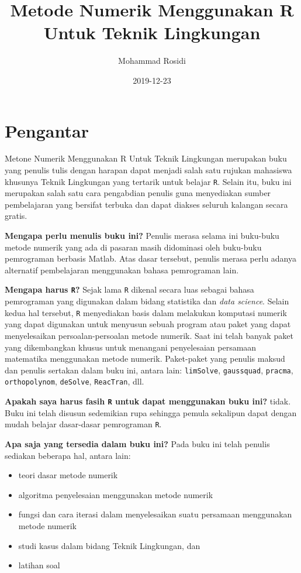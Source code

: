 \documentclass[]{book}
\title{Metode Numerik Menggunakan R Untuk Teknik Lingkungan}
\author{Mohammad Rosidi}
\date{2019-12-23}
\providecommand{\tightlist}{%
  \setlength{\itemsep}{0pt}\setlength{\parskip}{0pt}}
\theoremstyle{definition}
\theoremstyle{definition}
\theoremstyle{definition}
\theoremstyle{remark}
\begin{document}
\maketitle

{
\setcounter{tocdepth}{1}
\tableofcontents
}
\hypertarget{pengantar}{%
\chapter*{Pengantar}\label{pengantar}}

Metone Numerik Menggunakan R Untuk Teknik Lingkungan merupakan buku yang penulis tulis dengan harapan dapat menjadi salah satu rujukan mahasiswa khusunya Teknik Lingkungan yang tertarik untuk belajar \texttt{R}. Selain itu, buku ini merupakan salah satu cara pengabdian penulis guna menyediakan sumber pembelajaran yang bersifat terbuka dan dapat diakses seluruh kalangan secara gratis.

\textbf{Mengapa perlu menulis buku ini?} Penulis merasa selama ini buku-buku metode numerik yang ada di pasaran masih didominasi oleh buku-buku pemrograman berbasis Matlab. Atas dasar tersebut, penulis merasa perlu adanya alternatif pembelajaran menggunakan bahasa pemrograman lain.

\textbf{Mengapa harus \texttt{R}?} Sejak lama \texttt{R} dikenal secara luas sebagai bahasa pemrograman yang digunakan dalam bidang statistika dan \emph{data science}. Selain kedua hal tersebut, \texttt{R} menyediakan basis dalam melakukan komputasi numerik yang dapat digunakan untuk menyusun sebuah program atau paket yang dapat menyelesaikan persoalan-persoalan metode numerik. Saat ini telah banyak paket yang dikembangkan khusus untuk menangani penyelesaian persamaan matematika menggunakan metode numerik. Paket-paket yang penulis maksud dan penulis sertakan dalam buku ini, antara lain: \texttt{limSolve}, \texttt{gaussquad}, \texttt{pracma}, \texttt{orthopolynom}, \texttt{deSolve}, \texttt{ReacTran}, dll.

\textbf{Apakah saya harus fasih \texttt{R} untuk dapat menggunakan buku ini?} tidak. Buku ini telah disusun sedemikian rupa sehingga pemula sekalipun dapat dengan mudah belajar dasar-dasar pemrograman \texttt{R}.

\textbf{Apa saja yang tersedia dalam buku ini?} Pada buku ini telah penulis sediakan beberapa hal, antara lain:

\begin{itemize}
\tightlist
\item
  teori dasar metode numerik
\item
  algoritma penyelesaian menggunakan metode numerik
\item
  fungsi dan cara iterasi dalam menyelesaikan suatu persamaan menggunakan metode numerik
\item
  studi kasus dalam bidang Teknik Lingkungan, dan
\item
  latihan soal
\end{itemize}
\end{document}
